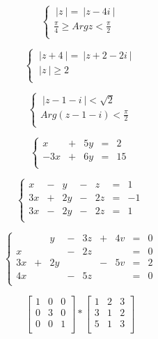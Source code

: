 \documentclass[12pt, letterpaper, titlepage]{article}
\begin{document}
$$
\begin{cases}
\ |z\ | = \ |z-4i\ |\\
\frac{\pi}{4} \geq Arg z < \frac{\pi}{2}\\

\end{cases}
$$

$$
\begin{cases}
\ |z + 4\ | = \ |z+2-2i\ |\\
\ |z \ | \geq 2\\

\end{cases}
$$

$$
\begin{cases}
\ |z-1-i\ | < \sqrt{2}\\
Arg (z-1-i) < \frac{\pi}{2}\\

\end{cases}
$$

$$
\left\{
\begin{array}{rrrrr}
 x&+&5y&=&2\\
-3x&+&6y&=&15\\
\end{array}
\right.
$$

$$
\left\{
\begin{array}{rrrrrrr}
 x&-&y&-&z&=&1\\
3x&+&2y&-&2z&=&-1\\
3x&-&2y&-&2z&=&1\\
\end{array}
\right.
$$

$$
\left\{
\begin{array}{rrrrrrrrr}
 & &y&-&3z&+&4v&=&0\\
x& & &-&2z& & &=&0\\
3x&+&2y& & &-&5v&=&2\\
4x&& & -&5z& & &=&0\\
\end{array}
\right.
$$

$$ \left[\begin{array}{ccc}
1&0&0\\
0&3&0\\
0&0&1\\
\end{array}\right]
*
\left[\begin{array}{ccc}
1&2&3 \\
3&1&2\\
5&1&3\\
\end{array}\right]
$$
\end{document}

